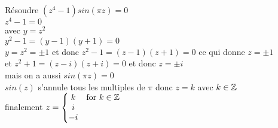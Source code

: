 
\begin{myExample}
Résoudre $(z^4-1)sin(\pi z)=0$
\\
$z^4-1=0$
\\
avec $y = z^2$
\\
$y^2 -1=(y-1)(y+1)=0$
\\
$y=z^2=\pm 1$ et donc $z^2-1=(z-1)(z+1)=0$ ce qui donne $z=\pm 1$
\\
et $z^2+1=(z-i)(z+i)=0$ et donc $z=\pm i$
\\
mais on a aussi $sin(\pi z)=0$
\\
$sin(z)$ s'annule tous les multiples de $\pi$ donc $z=k$ avec $k \in \mathbb{Z}$
\\
finalement $z=\left\{\begin{matrix} k &\mbox{for}\ k \in \mathbb{Z} \\i\\-i\end{matrix}\right.$
\end{myExample}









